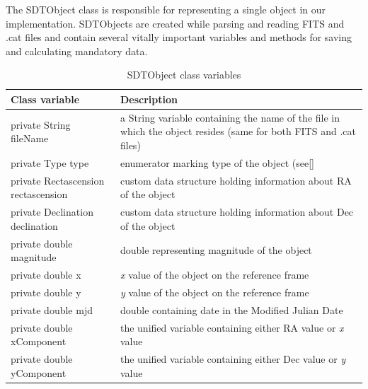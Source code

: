 	The SDTObject class is responsible for representing a single object in our implementation. SDTObjects are created while parsing and reading FITS and .cat files and contain several vitally important variables and methods for saving and calculating mandatory data.
	
\begin{table}[H]
\centering
\setlength{\extrarowheight}{2pt}
\begin{tabularx}{\textwidth}{|X|X|}
\hline
\textbf{Class variable} & \textbf{Description} \\ \hline
private String \mbox{fileName} & a String variable containing the name of the file in which the object resides (same for both FITS and .cat files) \\ \hline
private Type \mbox{type} & enumerator marking type of the object (see\ref{} \\ \hline
private \mbox{Rectascension} \mbox{rectascension} & custom data structure holding information about RA of the object \\ \hline
private \mbox{Declination} \mbox{declination} & custom data structure holding information about Dec of the object \\ \hline
private double \mbox{magnitude} & double representing magnitude of the object \\ \hline
private double \mbox{x} & \emph{x} value of the object on the reference frame \\ \hline
private double \mbox{y} & \emph{y} value of the object on the reference frame \\ \hline
private double \mbox{mjd} & double containing date in the Modified Julian Date \\ \hline
private double \mbox{xComponent} & the unified variable containing either RA value or \emph{x} value \\ \hline
private double \mbox{yComponent} & the unified variable containing either Dec value or \emph{y} value \\ \hline
\end{tabularx}
\caption{SDTObject class variables}
\label{tab:class_variables_O}
\end{table}


